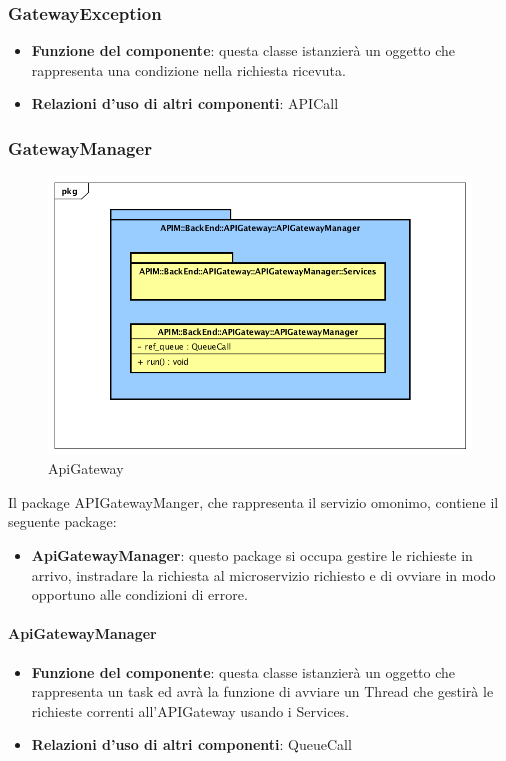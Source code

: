 \subsubsection{GatewayException}
\begin{itemize}
	\item \textbf{Funzione del componente}: questa classe istanzier\`{a} un oggetto che rappresenta una condizione nella richiesta ricevuta.
	\item \textbf{Relazioni d'uso di altri componenti}: APICall
\end{itemize}

\subsubsection{GatewayManager}
\begin{figure}[!htbp]
	\centering
	\includegraphics[scale=0.45]{UML/DiagrammiPackage/APIGatewayManager.png}
	\caption{ApiGateway}
\end{figure}

Il package APIGatewayManger, che rappresenta il servizio omonimo, contiene il seguente package:
\begin{itemize}
	\item \textbf{ApiGatewayManager}: questo package si occupa gestire le richieste in arrivo, instradare la richiesta al microservizio richiesto e di ovviare in modo opportuno alle condizioni di errore.
\end{itemize}

\paragraph{ApiGatewayManager}
\begin{itemize}
	\item \textbf{Funzione del componente}: questa classe istanzier\`{a} un oggetto che rappresenta un task ed avr\`{a} la funzione di avviare un Thread che gestir\`{a} le richieste correnti all'APIGateway usando i Services.
	\item \textbf{Relazioni d'uso di altri componenti}: QueueCall
\end{itemize}


